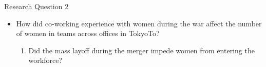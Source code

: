 \begin{frame}{Research Question 2}
    \begin{itemize}
        \item How did co-working experience with women during the war affect the number of women in teams across offices in TokyoTo?
        \begin{enumerate}
            \item Did the mass layoff during the merger impede women from entering the workforce?
        \end{enumerate}
    \end{itemize}
\end{frame}